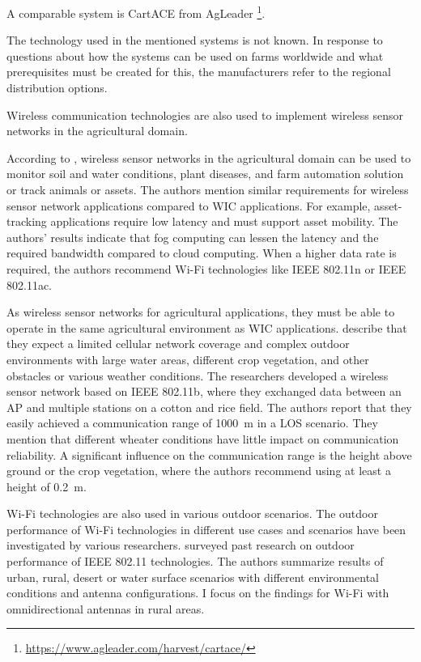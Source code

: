 A comparable system is CartACE from AgLeader \footnote{\url{https://www.agleader.com/harvest/cartace/}}.

The technology used in the mentioned systems is not known. In response to questions about how the systems can be used on farms worldwide and what prerequisites must be created for this, the manufacturers refer to the regional distribution options.

Wireless communication technologies are also used to implement wireless sensor networks in the agricultural domain.

According to \textcite{ahmed_internet_2018}, wireless sensor networks in the agricultural domain can be used to monitor soil and water conditions, plant diseases, and farm automation solution
or track animals or assets. The authors mention similar requirements for wireless sensor network applications compared to \ac{WIC} applications.
For example, asset-tracking applications require low latency and must support asset mobility.
The authors' results indicate that fog computing can lessen the latency and the required bandwidth compared to cloud computing.
When a higher data rate is required, the authors recommend Wi-Fi technologies like IEEE 802.11n or IEEE 802.11ac.

As wireless sensor networks for agricultural applications, they must be able to operate in the same agricultural environment as \ac{WIC} applications.
\textcite{brinkhoff_characterization_2017} describe that they expect a limited cellular network coverage and complex outdoor
environments with large water areas, different crop vegetation, and other obstacles or various weather conditions. The
researchers developed a wireless sensor network based on IEEE 802.11b, where they exchanged data between an \ac{AP} and multiple stations on
a cotton and rice field. The authors report that they easily achieved a communication range of \SI{1000}{\metre} in a \ac{LOS} scenario.
They mention that different wheater conditions have little impact on communication reliability. A significant influence on the communication range is the height above ground or the crop vegetation, where the authors recommend using at least a height of \SI{0.2}{\metre}.


Wi-Fi technologies are also used in various outdoor scenarios.
The outdoor performance of Wi-Fi technologies in different use cases and scenarios have been investigated by various researchers.
\textcite{aust_outdoor_2015} surveyed past research on outdoor performance of IEEE 802.11 technologies. The authors summarize results of
urban, rural, desert or water surface scenarios with different environmental conditions and antenna configurations. I focus on the
findings for Wi-Fi with omnidirectional antennas in rural areas.

